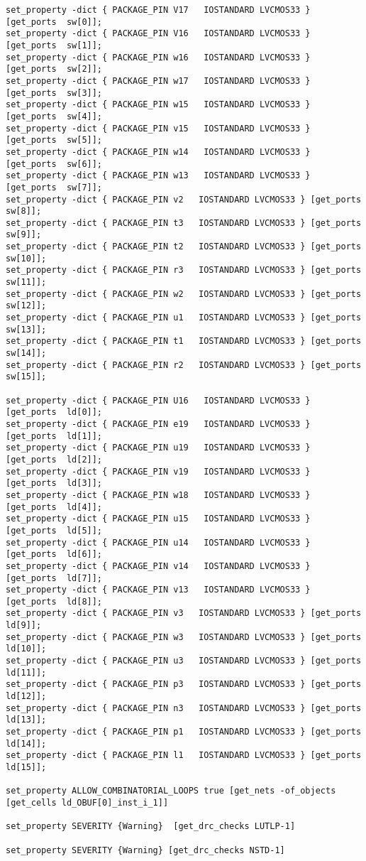 \documentclass{article}
\begin{document}
\begin{verbatim}
set_property -dict { PACKAGE_PIN V17   IOSTANDARD LVCMOS33 } [get_ports  sw[0]];
set_property -dict { PACKAGE_PIN V16   IOSTANDARD LVCMOS33 } [get_ports  sw[1]];
set_property -dict { PACKAGE_PIN w16   IOSTANDARD LVCMOS33 } [get_ports  sw[2]];
set_property -dict { PACKAGE_PIN w17   IOSTANDARD LVCMOS33 } [get_ports  sw[3]];
set_property -dict { PACKAGE_PIN w15   IOSTANDARD LVCMOS33 } [get_ports  sw[4]];
set_property -dict { PACKAGE_PIN v15   IOSTANDARD LVCMOS33 } [get_ports  sw[5]];
set_property -dict { PACKAGE_PIN w14   IOSTANDARD LVCMOS33 } [get_ports  sw[6]];
set_property -dict { PACKAGE_PIN w13   IOSTANDARD LVCMOS33 } [get_ports  sw[7]];
set_property -dict { PACKAGE_PIN v2   IOSTANDARD LVCMOS33 } [get_ports  sw[8]];
set_property -dict { PACKAGE_PIN t3   IOSTANDARD LVCMOS33 } [get_ports  sw[9]];
set_property -dict { PACKAGE_PIN t2   IOSTANDARD LVCMOS33 } [get_ports  sw[10]];
set_property -dict { PACKAGE_PIN r3   IOSTANDARD LVCMOS33 } [get_ports  sw[11]];
set_property -dict { PACKAGE_PIN w2   IOSTANDARD LVCMOS33 } [get_ports  sw[12]];
set_property -dict { PACKAGE_PIN u1   IOSTANDARD LVCMOS33 } [get_ports  sw[13]];
set_property -dict { PACKAGE_PIN t1   IOSTANDARD LVCMOS33 } [get_ports  sw[14]];
set_property -dict { PACKAGE_PIN r2   IOSTANDARD LVCMOS33 } [get_ports  sw[15]];

set_property -dict { PACKAGE_PIN U16   IOSTANDARD LVCMOS33 } [get_ports  ld[0]];
set_property -dict { PACKAGE_PIN e19   IOSTANDARD LVCMOS33 } [get_ports  ld[1]];
set_property -dict { PACKAGE_PIN u19   IOSTANDARD LVCMOS33 } [get_ports  ld[2]];
set_property -dict { PACKAGE_PIN v19   IOSTANDARD LVCMOS33 } [get_ports  ld[3]];
set_property -dict { PACKAGE_PIN w18   IOSTANDARD LVCMOS33 } [get_ports  ld[4]];
set_property -dict { PACKAGE_PIN u15   IOSTANDARD LVCMOS33 } [get_ports  ld[5]];
set_property -dict { PACKAGE_PIN u14   IOSTANDARD LVCMOS33 } [get_ports  ld[6]];
set_property -dict { PACKAGE_PIN v14   IOSTANDARD LVCMOS33 } [get_ports  ld[7]];
set_property -dict { PACKAGE_PIN v13   IOSTANDARD LVCMOS33 } [get_ports  ld[8]];
set_property -dict { PACKAGE_PIN v3   IOSTANDARD LVCMOS33 } [get_ports  ld[9]];
set_property -dict { PACKAGE_PIN w3   IOSTANDARD LVCMOS33 } [get_ports  ld[10]];
set_property -dict { PACKAGE_PIN u3   IOSTANDARD LVCMOS33 } [get_ports  ld[11]];
set_property -dict { PACKAGE_PIN p3   IOSTANDARD LVCMOS33 } [get_ports  ld[12]];
set_property -dict { PACKAGE_PIN n3   IOSTANDARD LVCMOS33 } [get_ports  ld[13]];
set_property -dict { PACKAGE_PIN p1   IOSTANDARD LVCMOS33 } [get_ports  ld[14]];
set_property -dict { PACKAGE_PIN l1   IOSTANDARD LVCMOS33 } [get_ports  ld[15]];

set_property ALLOW_COMBINATORIAL_LOOPS true [get_nets -of_objects [get_cells ld_OBUF[0]_inst_i_1]]

set_property SEVERITY {Warning}  [get_drc_checks LUTLP-1]

set_property SEVERITY {Warning} [get_drc_checks NSTD-1]
\end{verbatim}
\end{document}
